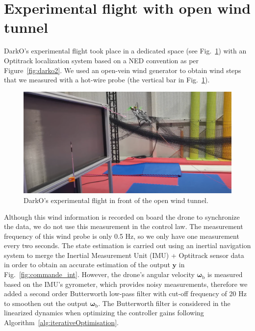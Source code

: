 \section{Experimental flight with open wind tunnel} 
\label{sec:exp}
DarkO's experimental flight took place in a dedicated space (see Fig.~\ref{fig:flight_windshape}) with an Optitrack localization system based on a NED convention as per Figure~\ref{fig:darko2}. We used an open-vein wind generator to obtain wind steps that we measured with a hot-wire probe (the vertical bar in Fig.~\ref{fig:flight_windshape}). 
\begin{figure}[ht!]
    \centering
    \includegraphics[trim=0cm 0cm 0cm 0cm,clip,width=1\columnwidth]{figures/img_flight_darko.png}
    \caption{DarkO's experimental flight in front of the open wind tunnel.}
    \label{fig:flight_windshape}
\end{figure}
Although this wind information is recorded on board the drone to synchronize the data, we do not use this measurement in the control law. The measurement frequency of this wind probe is only 0.5 Hz, so we only have one measurement every two seconds. 
The state estimation is carried out using an inertial navigation system to merge the Inertial Measurement Unit (IMU) + Optitrack sensor data in order to obtain an accurate estimation of the output $\boldsymbol{y}$ in Fig.~\ref{fig:commande_int}. However, the drone's angular velocity $\boldsymbol{\omega}_{\text{b}}$ is measured based on the IMU's gyrometer, which provides noisy measurements, therefore we added a second order Butterworth low-pass filter with cut-off frequency of 20 Hz to smoothen out the output $\boldsymbol{\omega}_{\text{b}}$. The Butterworth filter is considered in the linearized dynamics when optimizing the controller gains following Algorithm~\ref{alg:iterativeOptimisation}. 
